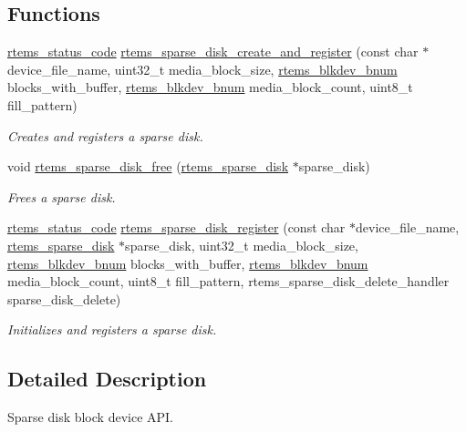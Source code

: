 \subsection*{Functions}
\begin{DoxyCompactItemize}
\item 
\mbox{\hyperlink{group__ClassicStatus_ga545d41846817eaba6143d52ee4d9e9fe}{rtems\+\_\+status\+\_\+code}} \mbox{\hyperlink{group__rtems__sparse__disk_ga520bd068988717a02e0832c115760ef4}{rtems\+\_\+sparse\+\_\+disk\+\_\+create\+\_\+and\+\_\+register}} (const char $\ast$device\+\_\+file\+\_\+name, uint32\+\_\+t media\+\_\+block\+\_\+size, \mbox{\hyperlink{group__rtems__disk_ga5fbcfd40b657bff6c54d9e393fab3274}{rtems\+\_\+blkdev\+\_\+bnum}} blocks\+\_\+with\+\_\+buffer, \mbox{\hyperlink{group__rtems__disk_ga5fbcfd40b657bff6c54d9e393fab3274}{rtems\+\_\+blkdev\+\_\+bnum}} media\+\_\+block\+\_\+count, uint8\+\_\+t fill\+\_\+pattern)
\begin{DoxyCompactList}\small\item\em Creates and registers a sparse disk. \end{DoxyCompactList}\item 
void \mbox{\hyperlink{group__rtems__sparse__disk_gae6a3909209876365980517aa319c7f87}{rtems\+\_\+sparse\+\_\+disk\+\_\+free}} (\mbox{\hyperlink{structrtems__sparse__disk}{rtems\+\_\+sparse\+\_\+disk}} $\ast$sparse\+\_\+disk)
\begin{DoxyCompactList}\small\item\em Frees a sparse disk. \end{DoxyCompactList}\item 
\mbox{\hyperlink{group__ClassicStatus_ga545d41846817eaba6143d52ee4d9e9fe}{rtems\+\_\+status\+\_\+code}} \mbox{\hyperlink{group__rtems__sparse__disk_ga9c0612d8fec13b50359553e5efa15265}{rtems\+\_\+sparse\+\_\+disk\+\_\+register}} (const char $\ast$device\+\_\+file\+\_\+name, \mbox{\hyperlink{structrtems__sparse__disk}{rtems\+\_\+sparse\+\_\+disk}} $\ast$sparse\+\_\+disk, uint32\+\_\+t media\+\_\+block\+\_\+size, \mbox{\hyperlink{group__rtems__disk_ga5fbcfd40b657bff6c54d9e393fab3274}{rtems\+\_\+blkdev\+\_\+bnum}} blocks\+\_\+with\+\_\+buffer, \mbox{\hyperlink{group__rtems__disk_ga5fbcfd40b657bff6c54d9e393fab3274}{rtems\+\_\+blkdev\+\_\+bnum}} media\+\_\+block\+\_\+count, uint8\+\_\+t fill\+\_\+pattern, rtems\+\_\+sparse\+\_\+disk\+\_\+delete\+\_\+handler sparse\+\_\+disk\+\_\+delete)
\begin{DoxyCompactList}\small\item\em Initializes and registers a sparse disk. \end{DoxyCompactList}\end{DoxyCompactItemize}


\subsection{Detailed Description}
Sparse disk block device A\+PI. 


